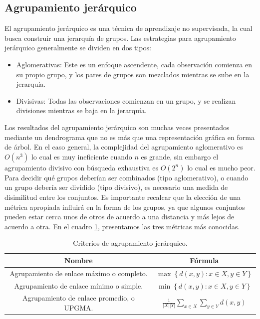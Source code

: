 \documentclass[12pt]{report} %
\theoremstyle{definition}
\begin{document}
{\subsection{Agrupamiento jerárquico}

El agrupamiento jerárquico es una técnica de aprendizaje no supervisada, la cual busca construir una jerarquía de grupos. Las estrategias para agrupamiento jerárquico generalmente se dividen en dos tipos:

\begin{itemize}
	\item Aglomerativas: Este es un enfoque ascendente, cada observación comienza en su propio grupo, y los pares de grupos son mezclados mientras se sube en la jerarquía.
	\item Divisivas: Todas las observaciones comienzan en un grupo, y se realizan divisiones mientras se baja en la jerarquía. 
\end{itemize}

Los resultados del agrupamiento jerárquico son muchas veces presentados mediante un dendrograma que no es más que una representación gráfica en forma de árbol. En el caso general, la complejidad del agrupamiento aglomerativo es $O(n^3)$ lo cual es muy ineficiente cuando $n$ es grande, sin embargo el agrupamiento divisivo con búsqueda exhaustiva es $O(2^n)$ lo cual es mucho peor.\\

Para decidir qué grupos deberían ser combinados (tipo aglomerativo), o cuando un grupo debería ser dividido (tipo divisivo), es necesario una medida de disimilitud entre los conjuntos. Es importante recalcar que la elección de una métrica apropiada influirá en la forma de los grupos, ya que algunos conjuntos pueden estar cerca unos de otros de acuerdo a una distancia y más lejos de acuerdo a otra. En el cuadro \ref{tab:linkage}, presentamos las tres métricas más conocidas. \cite{clustermetodos}

\begin{table}[H] 
	\centering
	\caption{Criterios de agrupamiento jerárquico.} 
	\begin{tabular}{|c|c|}
		\hline
		Nombre                                           & Fórmula \\ \hline
		Agrupamiento de enlace máximo o completo.         & $ \max \left\lbrace d(x,y): x \in X, y \in Y \right\rbrace $ \\ \hline
		Agrupamiento de enlace mínimo o simple.            &     $ \min \left\lbrace d(x,y): x \in X, y \in Y \right\rbrace $     \\ \hline
		Agrupamiento de enlace promedio, o UPGMA. &   $\frac{1}{|X||Y|}\sum_{x\in X}\sum_{y\in Y}d(x,y)$      \\ \hline
	\end{tabular}
\label{tab:linkage}
\end{table}

}
\end{document}
